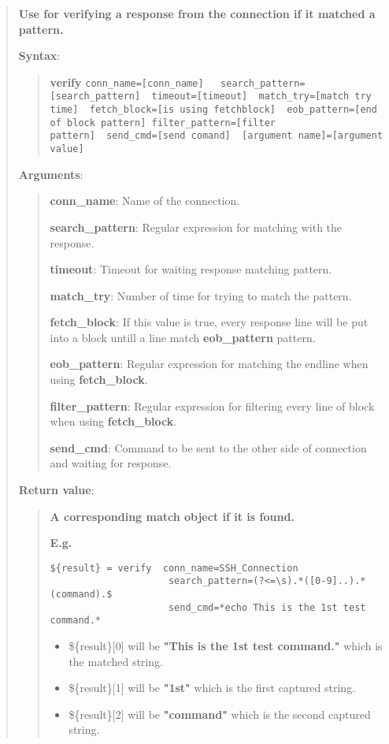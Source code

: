 \begin{quote}
\textbf{Use for verifying a response from the connection if it matched a
pattern.}

\textbf{Syntax}:

\begin{quote}
\textbf{verify}
\texttt{conn\_name={[}conn\_name{]}\ \ \ search\_pattern={[}search\_pattern{]}\ \ timeout={[}timeout{]}\ \ match\_try={[}match try time{]}\ \ fetch\_block={[}is using fetchblock{]}\ \ eob\_pattern={[}end of block pattern{]}\ filter\_pattern={[}filter pattern{]}\ \ send\_cmd={[}send comand{]}\ \ {[}argument name{]}={[}argument value{]}}
\end{quote}

\textbf{Arguments}:

\begin{quote}
\textbf{conn\_name}: Name of the connection.

\textbf{search\_pattern}: Regular expression for matching with the response.

\textbf{timeout}: Timeout for waiting response matching pattern.

\textbf{match\_try}: Number of time for trying to match the pattern.

\textbf{fetch\_block}: If this value is true, every response line will
be put into a block untill a line match \textbf{eob\_pattern} pattern.

\textbf{eob\_pattern}: Regular expression for matching the endline when
using \textbf{fetch\_block}.

\textbf{filter\_pattern}: Regular expression for filtering every line of
block when using \textbf{fetch\_block}.

\textbf{send\_cmd}: Command to be sent to the other side of connection
and waiting for response.
\end{quote}

\textbf{Return value}:

\begin{quote}
\textbf{A corresponding match object if it is found.}

\textbf{E.g.}

\begin{verbatim}
${result} = verify  conn_name=SSH_Connection
                     search_pattern=(?<=\s).*([0-9]..).*(command).$
                     send_cmd=*echo This is the 1st test command.*
\end{verbatim}

\begin{itemize}
\tightlist
\item
  \$\{result\}{[}0{]} will be \textbf{"This is the 1st test command."}
  which is the matched string.
\item
  \$\{result\}{[}1{]} will be \textbf{"1st"} which is the first captured
  string.
\item
  \$\{result\}{[}2{]} will be \textbf{"command"} which is the second
  captured string.
\end{itemize}
\end{quote}
\end{quote}

